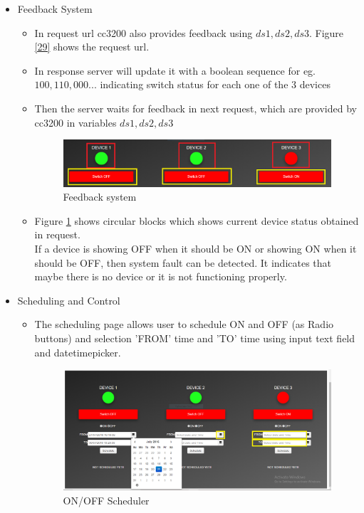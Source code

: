 \documentclass[a4paper,12pt,oneside]{book}
\begin{document}
\begin{itemize}
\begin{itemize}
		\hspace{10px}
		
	\end{itemize}
	\item{Feedback System}
	\begin{itemize}	
		\item{In request url cc3200 also provides feedback using $ds1,ds2,ds3$. Figure \ref{29} shows the request url.}
		\item{In response server will update it with a boolean sequence for eg.$100,110,000...$ indicating switch status for each one of the 3 devices  } 
		\item{Then the server waits for feedback in next request, which are provided by cc3200 in variables $ds1,ds2,ds3$}
		
		
		\begin{figure}[H]  \centering
			\includegraphics[width=15cm]{feedback.png}
			\caption{Feedback system}
			\label{fig: figure_feedback}
		\end{figure}
		\hspace{10px}
		\item{Figure \ref{fig: figure_feedback} shows circular blocks which shows current device status obtained in request.\\ If  a device is showing OFF when it should be ON or showing ON when it should be OFF, then system fault can be detected. It indicates that maybe there is no device or it is not functioning properly. }
	\end{itemize}
	\item{Scheduling and Control}
	\begin{itemize}	
		\item{The scheduling page allows user to schedule ON and OFF (as Radio buttons)  and selection 'FROM' time and 'TO' time using input text field and datetimepicker.}
		\hspace{10px}
		
		\begin{figure}[H]  \centering
			\includegraphics[width=15cm]{scheduler.png}
			\caption{ ON/OFF Scheduler}
			\label{17}
		\end{figure}
		

\end{itemize}
\end{itemize}
\end{document}
